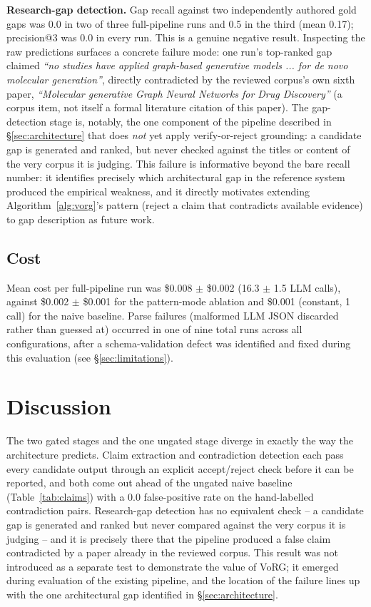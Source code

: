 \documentclass[11pt]{article}
\begin{document}
\textbf{Research-gap detection.} Gap recall against two independently authored gold gaps was 0.0 in two of three full-pipeline runs and 0.5 in the third (mean 0.17); precision@3 was 0.0 in every run. This is a genuine negative result. Inspecting the raw predictions surfaces a concrete failure mode: one run's top-ranked gap claimed \emph{``no studies have applied graph-based generative models ... for de novo molecular generation''}, directly contradicted by the reviewed corpus's own sixth paper, \emph{``Molecular generative Graph Neural Networks for Drug Discovery''} (a corpus item, not itself a formal literature citation of this paper). The gap-detection stage is, notably, the one component of the pipeline described in \S\ref{sec:architecture} that does \emph{not} yet apply verify-or-reject grounding: a candidate gap is generated and ranked, but never checked against the titles or content of the very corpus it is judging. This failure is informative beyond the bare recall number: it identifies precisely which architectural gap in the reference system produced the empirical weakness, and it directly motivates extending Algorithm~\ref{alg:vorg}'s pattern (reject a claim that contradicts available evidence) to gap description as future work.

\subsection{Cost}

Mean cost per full-pipeline run was \$0.008 $\pm$ \$0.002 (16.3 $\pm$ 1.5 LLM calls), against \$0.002 $\pm$ \$0.001 for the pattern-mode ablation and \$0.001 (constant, 1 call) for the naive baseline. Parse failures (malformed LLM JSON discarded rather than guessed at) occurred in one of nine total runs across all configurations, after a schema-validation defect was identified and fixed during this evaluation (see \S\ref{sec:limitations}).

\section{Discussion}
\label{sec:discussion}

The two gated stages and the one ungated stage diverge in exactly the way the architecture predicts. Claim extraction and contradiction detection each pass every candidate output through an explicit accept/reject check before it can be reported, and both come out ahead of the ungated naive baseline (Table~\ref{tab:claims}) with a 0.0 false-positive rate on the hand-labelled contradiction pairs. Research-gap detection has no equivalent check -- a candidate gap is generated and ranked but never compared against the very corpus it is judging -- and it is precisely there that the pipeline produced a false claim contradicted by a paper already in the reviewed corpus. This result was not introduced as a separate test to demonstrate the value of VoRG; it emerged during evaluation of the existing pipeline, and the location of the failure lines up with the one architectural gap identified in \S\ref{sec:architecture}.
\end{document}
